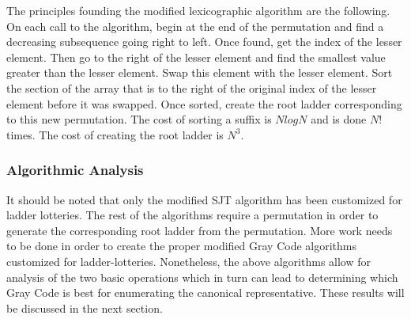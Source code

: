 The principles founding the modified lexicographic algorithm are the following.
On each call to the algorithm, begin at the end of the permutation and 
find a decreasing subsequence going right to left. Once found, get the index 
of the lesser element. Then go to the right of the lesser element and find the 
smallest value greater than the lesser element. Swap this element with the lesser element. 
Sort the section of the array that is to the right of the original index of the 
lesser element before it was swapped. Once sorted, create the root ladder corresponding 
to this new permutation. The cost of sorting a suffix is $Nlog{N}$ and is done $N!$ times.
The cost of creating the root ladder is $N^{3}$.

\subsubsection{Algorithmic Analysis}
  It should be noted that only the modified SJT algorithm has been customized for ladder lotteries. The rest of the algorithms 
  require a permutation in order to generate the corresponding root ladder from the permutation. More work needs to be done in 
  order to create the proper modified Gray Code algorithms customized for ladder-lotteries. 
  Nonetheless, the above algorithms allow for analysis of the two basic operations which in turn can lead to determining which Gray Code is best 
  for enumerating the canonical representative. These results will be discussed in the next section.